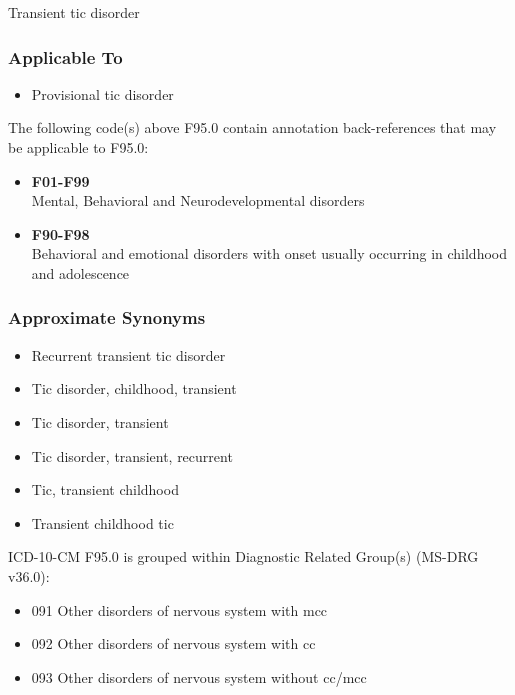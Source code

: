 Transient tic disorder

\hypertarget{applicable-to}{%
\subsubsection{Applicable To}\label{applicable-to}}

\begin{itemize}
\tightlist
\item
  Provisional tic disorder
\end{itemize}

\noindent The following code(s) above F95.0 contain annotation back-references that may be applicable to F95.0:

\begin{itemize}
\tightlist
\item
  \textbf{F01-F99}\\
  Mental, Behavioral and Neurodevelopmental disorders
\item
  \textbf{F90-F98}\\
  Behavioral and emotional disorders with onset usually occurring in childhood and adolescence
\end{itemize}

\hypertarget{approximate-synonyms}{%
\subsubsection{Approximate Synonyms}\label{approximate-synonyms}}

\begin{itemize}
\tightlist
\item
  Recurrent transient tic disorder
\item
  Tic disorder, childhood, transient
\item
  Tic disorder, transient
\item
  Tic disorder, transient, recurrent
\item
  Tic, transient childhood
\item
  Transient childhood tic
\end{itemize}

\noindent ICD-10-CM F95.0 is grouped within Diagnostic Related Group(s) (MS-DRG v36.0):

\begin{itemize}
\tightlist
\item
  091 Other disorders of nervous system with mcc
\item
  092 Other disorders of nervous system with cc
\item
  093 Other disorders of nervous system without cc/mcc
\end{itemize}

